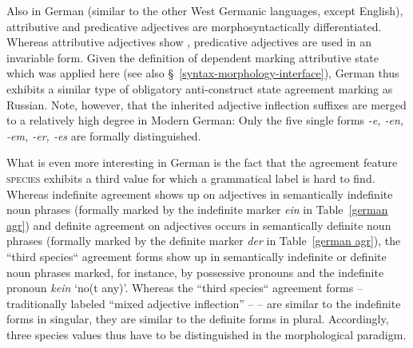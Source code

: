 Also in German (similar to the other West Germanic languages, except English), attributive and predicative adjectives are morphosyntactically differentiated. Whereas attributive adjectives show , predicative adjectives are used in an invariable form. Given the definition of dependent marking attributive state which was applied here (see also \S~\ref{syntax-morphology-interface}), German thus exhibits a similar type of obligatory anti\hyp{}construct state agreement marking as Russian. Note, however, that the inherited adjective inflection suffixes are merged to a relatively high degree in Modern German: Only the five single forms \textit{-e, -en, -em, -er, -es} are formally distinguished.

What is even more interesting in German is the fact that the agreement feature \textsc{species} exhibits a third value for which a grammatical label is hard to find. Whereas indefinite agreement shows up on adjectives in semantically indefinite noun phrases (formally marked by the indefinite marker \textit{ein} in Table~\ref{german agr}) and definite agreement on adjectives occurs in semantically definite noun phrases (formally marked by the definite marker \textit{der} in Table~\ref{german agr}), the “third species“ agreement forms show up in semantically indefinite or definite noun phrases marked, for instance, by possessive pronouns and the indefinite pronoun \textit{kein} ‘no(t any)’. Whereas the “third species“ agreement forms – traditionally labeled “mixed adjective inflection” – \citep[cf.][244–245]{schafer2015a} – are similar to the indefinite forms in singular, they are similar to the definite forms in plural. Accordingly, three species values thus have to be distinguished in the morphological paradigm.

